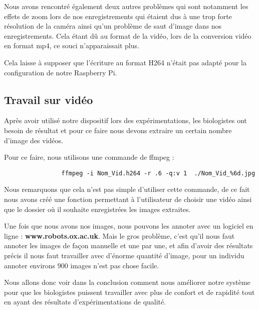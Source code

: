         \vspace{0.2cm}

        Nous avons rencontré également deux autres problèmes qui sont notamment les effets de zoom lors de nos enregistrements qui étaient dus à une trop forte résolution de la caméra ainsi qu'un problème de saut d'image dans nos enregistrements. Cela étant dû au format de la vidéo, lors de la conversion vidéo en format mp4, ce souci n'apparaissait plus.

        \vspace{0.2cm}

        Cela laisse à supposer que l'écriture au format H264 n'était pas adapté pour la configuration de notre Raspberry Pi.

        \subsection{Travail sur vidéo}
        Après avoir utilisé notre dispositif lors des expérimentations, les biologistes ont besoin de résultat et pour ce faire nous devons extraire un certain nombre d'image des vidéos.

        \begin{flushleft}
            Pour ce faire, nous utilisons une commande de ffmpeg :
        
            \begin{verbatim}
                ffmpeg -i Nom_Vid.h264 -r .6 -q:v 1  ./Nom_Vid_%6d.jpg
            \end{verbatim}            


        \end{flushleft}

        Nous remarquons que cela n'est pas simple d'utiliser cette commande, de ce fait nous avons créé une fonction permettant à l'utilisateur de choisir une vidéo ainsi que le dossier où il souhaite enregistrées les images extraites. 
        
        \vspace{0.2cm}

        Une fois que nous avons nos images, nous pouvons les annoter avec un logiciel en ligne : \textbf{www.robots.ox.ac.uk}.
        Mais le gros problème, c'est qu'il nous faut annoter les images de façon manuelle et une par une, et afin d'avoir des résultats précis il nous faut travailler avec d'énorme quantité d'image, pour un individu annoter environs 900 images n'est pas chose facile.

        \vspace{0.2cm}

        Nous allons donc voir dans la conclusion comment nous améliorer notre système pour que les biologistes puissent travailler avec plus de confort et de rapidité tout en ayant des résultats d'expérimentations de qualité.
